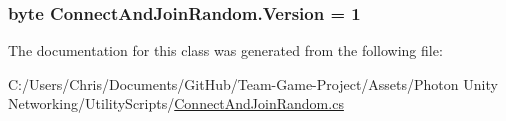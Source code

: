 \subsubsection[{\texorpdfstring{Version}{Version}}]{\setlength{\rightskip}{0pt plus 5cm}byte Connect\+And\+Join\+Random.\+Version = 1}\hypertarget{class_connect_and_join_random_a3cfdc20e538daf4b47e15c90a8fd677b}{}\label{class_connect_and_join_random_a3cfdc20e538daf4b47e15c90a8fd677b}


The documentation for this class was generated from the following file\+:\begin{DoxyCompactItemize}
\item 
C\+:/\+Users/\+Chris/\+Documents/\+Git\+Hub/\+Team-\/\+Game-\/\+Project/\+Assets/\+Photon Unity Networking/\+Utility\+Scripts/\hyperlink{_connect_and_join_random_8cs}{Connect\+And\+Join\+Random.\+cs}\end{DoxyCompactItemize}
